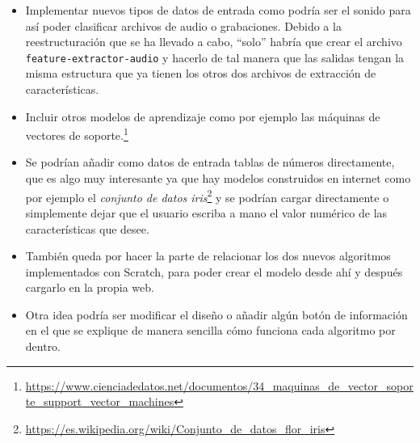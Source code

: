 \documentclass[a4paper, 12pt]{book}
\begin{document}
\begin{itemize}
  	\item Implementar nuevos tipos de datos de entrada como podría ser el sonido para así poder clasificar archivos de audio o grabaciones. Debido a la reestructuración que se ha llevado a cabo, ``solo'' habría que crear el archivo \texttt{feature-extractor-audio} y hacerlo de tal manera que las salidas tengan la misma estructura que ya tienen los otros dos archivos de extracción de características.

	\item Incluir otros modelos de aprendizaje como por ejemplo las máquinas de vectores de soporte.\footnote{\url{https://www.cienciadedatos.net/documentos/34_maquinas_de_vector_soporte_support_vector_machines}}

	\item Se podrían añadir como datos de entrada tablas de números directamente, que es algo muy interesante ya que hay modelos construidos en internet como por ejemplo el \emph{conjunto de datos iris}\footnote{\url{https://es.wikipedia.org/wiki/Conjunto_de_datos_flor_iris}} y se podrían cargar directamente o simplemente dejar que el usuario escriba a mano el valor numérico de las características que desee. 

	\item También queda por hacer la parte de relacionar los dos nuevos algoritmos implementados con Scratch, para poder crear el modelo desde ahí y después cargarlo en la propia web. 

	\item Otra idea podría ser modificar el diseño o añadir algún botón de información en el que se explique de manera sencilla cómo funciona cada algoritmo por dentro.
\end{itemize}




\end{document}
